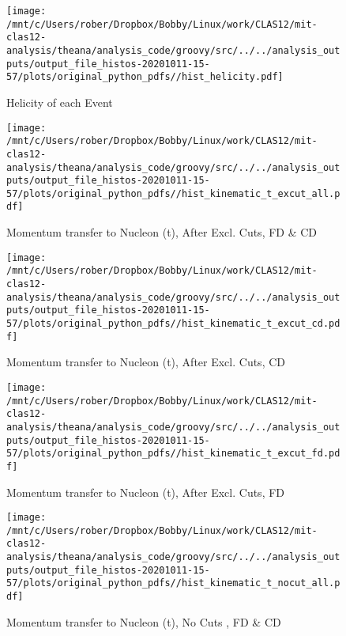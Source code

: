 \documentclass{article}
\begin{document}
\begin{landscape}
    \begin{figure}[h]
        \centering

        \texttt{[image: /mnt/c/Users/rober/Dropbox/Bobby/Linux/work/CLAS12/mit-clas12-analysis/theana/analysis\_code/groovy/src/../../analysis\_outputs/output\_file\_histos-20201011-15-57/plots/original\_python\_pdfs//hist\_helicity.pdf]}
        \captionsetup{textformat=empty,labelformat=blank}
        \caption{Helicity of each Event}
    \end{figure}
    \clearpage
    
    \begin{figure}[h]
        \centering

        \texttt{[image: /mnt/c/Users/rober/Dropbox/Bobby/Linux/work/CLAS12/mit-clas12-analysis/theana/analysis\_code/groovy/src/../../analysis\_outputs/output\_file\_histos-20201011-15-57/plots/original\_python\_pdfs//hist\_kinematic\_t\_excut\_all.pdf]}
        \captionsetup{textformat=empty,labelformat=blank}
        \caption{Momentum transfer to Nucleon (t), After Excl. Cuts, FD \& CD}
    \end{figure}
    \clearpage
    
    \begin{figure}[h]
        \centering

        \texttt{[image: /mnt/c/Users/rober/Dropbox/Bobby/Linux/work/CLAS12/mit-clas12-analysis/theana/analysis\_code/groovy/src/../../analysis\_outputs/output\_file\_histos-20201011-15-57/plots/original\_python\_pdfs//hist\_kinematic\_t\_excut\_cd.pdf]}
        \captionsetup{textformat=empty,labelformat=blank}
        \caption{Momentum transfer to Nucleon (t), After Excl. Cuts, CD}
    \end{figure}
    \clearpage
    
    \begin{figure}[h]
        \centering

        \texttt{[image: /mnt/c/Users/rober/Dropbox/Bobby/Linux/work/CLAS12/mit-clas12-analysis/theana/analysis\_code/groovy/src/../../analysis\_outputs/output\_file\_histos-20201011-15-57/plots/original\_python\_pdfs//hist\_kinematic\_t\_excut\_fd.pdf]}
        \captionsetup{textformat=empty,labelformat=blank}
        \caption{Momentum transfer to Nucleon (t), After Excl. Cuts, FD}
    \end{figure}
    \clearpage
    
    \begin{figure}[h]
        \centering

        \texttt{[image: /mnt/c/Users/rober/Dropbox/Bobby/Linux/work/CLAS12/mit-clas12-analysis/theana/analysis\_code/groovy/src/../../analysis\_outputs/output\_file\_histos-20201011-15-57/plots/original\_python\_pdfs//hist\_kinematic\_t\_nocut\_all.pdf]}
        \captionsetup{textformat=empty,labelformat=blank}
        \caption{Momentum transfer to Nucleon (t), No Cuts , FD \& CD}
    \end{figure}
    \clearpage
    

\end{landscape}
\end{document}
